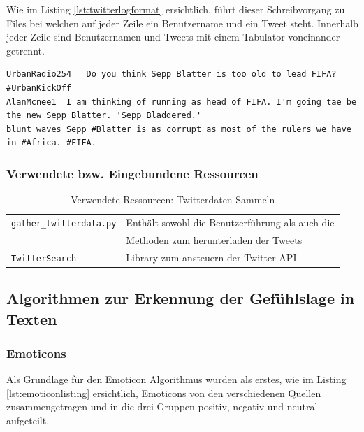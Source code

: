 Wie im Listing \ref{lst:twitterlogformat} ersichtlich, führt dieser Schreibvorgang zu Files bei welchen auf jeder Zeile ein Benutzername und ein Tweet steht. Innerhalb jeder Zeile sind Benutzernamen und Tweets mit einem Tabulator voneinander getrennt.

\begin{lstlisting}[showtabs=true, caption={Twitter Logfile Format)}, label={lst:twitterlogformat}]
UrbanRadio254	Do you think Sepp Blatter is too old to lead FIFA? #UrbanKickOff
AlanMcnee1	I am thinking of running as head of FIFA. I'm going tae be the new Sepp Blatter. 'Sepp Bladdered.'
blunt_waves	Sepp #Blatter is as corrupt as most of the rulers we have in #Africa. #FIFA.
\end{lstlisting}

\subsubsection{Verwendete bzw. Eingebundene Ressourcen}
\begin{table}[H]
\begin{center}
\begin{tabular}{|l|l|}
	\hline
	\lstinline$gather_twitterdata.py$ & Enthält sowohl die Benutzerführung als auch die\\
	& Methoden zum herunterladen der Tweets \\ \hline
	\lstinline$TwitterSearch$ & Library zum ansteuern der Twitter API\\ \hline
\end{tabular}
\caption{Verwendete Ressourcen: Twitterdaten Sammeln}
\end{center}
\end{table}

\subsection{Algorithmen zur Erkennung der Gefühlslage in Texten}
\subsubsection{Emoticons}
Als Grundlage für den Emoticon Algorithmus wurden als erstes, wie im Listing \ref{lst:emoticonlisting} ersichtlich, Emoticons von den verschiedenen Quellen \cite{emoticons1}\cite{emoticons2}\cite{emoticons3}\cite{emoticons4} zusammengetragen und in die drei Gruppen positiv, negativ und neutral aufgeteilt.

